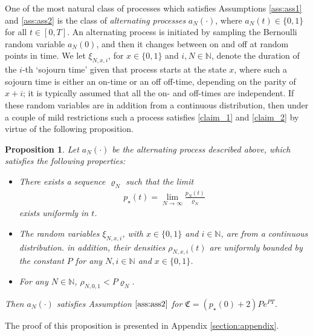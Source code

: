 \documentclass[11pt,reqno]{amsart}
\numberwithin{equation}{section}
\newcommand{\N}{\mathbb{N}}
\newtheorem{prop}[theo]{Proposition}
\newcommand{\CLM}[1]{{\color{red}#1}}
\begin{document}
    One of the most natural class of processes which satisfies Assumptions \ref{ass:ass1} and \ref{ass:ass2} is the class of  \emph{alternating  processes} {$a_N(\cdot)$, where $a_N(t)\in\{0,1\}$ for all $t\in[0,T]$}. An alternating  process is initiated by sampling the Bernoulli random variable $a_N(0)$, and then it changes between on and off at random points in time. We let $\xi_{N,x,i}$, for $x\in\{0,1\}$ and $i,N\in\N$, denote the duration of the $i$-th `sojourn time'   given that process starts at the state $x$, where such a sojourn time is either an on-time or an off off-time, depending on the parity of $x+i$; it is typically assumed that all the on- and off-times are independent. If these random variables are in addition from a continuous distribution, then under a couple of mild restrictions such a process satisfies \eqref{claim_1} and \eqref{claim_2} by virtue of the following proposition.

    \begin{prop}\label{example}
    Let {$a_N(\cdot)$} be the alternating process described above, which satisfies the following properties:
    \begin{itemize}
        \item[$\circ$]{There exists a sequence $\varrho_N$ such that the limit \begin{align*}p_{\star}(t) = \lim_{N\to\infty}\frac{p_N(t)}{\varrho_N}\end{align*} exists uniformly in $t$.}
        \item[$\circ$]{The random variables $\xi_{N,x,i}$, with $x\in\{0,1\}$ and $i\in{\mathbb N}$, are from a continuous distribution. in addition, their densities $\rho_{N,x,i}(t)$ are uniformly bounded by the constant $P$ for any $N,i\in\N$ and $x\in\{0,1\}$.}
        \item[$\circ$]{ For any $N\in\N$, $\rho_{N,0,1}<P\varrho_N$.}
    \end{itemize}
    Then $a_N(\cdot)$ satisfies Assumption $\ref{ass:ass2}$ for ${\mathfrak{C}} = (p_{\star}(0)+2)Pe^{PT}$.
    \end{prop}

    The proof of this proposition is presented in Appendix \ref{section:appendix}.
\end{document}
